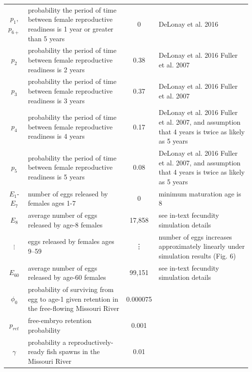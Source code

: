 \documentclass[12pt]{article}
\begin{document}
\begin{longtable}{cp{5.5cm}cp{5cm}}
$p_1$, $p_{6+}$ & probability the period of time between female reproductive readiness is 1 year or greater than 5 years \newline & 0 & DeLonay et al. 2016\\
$p_2$ & probability the period of time between female reproductive readiness is 2 years \newline & 0.38 & DeLonay et al. 2016 \newline Fuller et al. 2007\\
$p_3$ & probability the period of time between female reproductive readiness is 3 years \newline & 0.37 & DeLonay et al. 2016 \newline Fuller et al. 2007\\
$p_4$ & probability the period of time between female reproductive readiness is 4 years \newline & 0.17 & DeLonay et al. 2016 \newline Fuller et al. 2007, and \newline assumption that 4 years is twice as likely as 5 years \newline\\
$p_5$ & probability the period of time between female reproductive readiness is 5 years \newline & 0.08 & DeLonay et al. 2016 \newline Fuller et al. 2007, and \newline assumption that 4 years is twice as likely as 5 years\newline\\
$E_{1}$-$E_7$ & number of eggs released by females ages 1-7 \newline & 0 & minimum maturation age is 8\\
$E_8$ & average number of eggs released by age-8 females \newline & 17,858 & see in-text fecundity simulation details\\
$\vdots$ & eggs released by females ages 9--59 \newline & \vdots & number of eggs increases approximately linearly under simulation results (Fig. 6) \newline \\
$E_{60}$ & average number of eggs released by age-60 females \newline & 99,151 & see in-text fecundity simulation details\\
$\phi_{0}$ & probability of surviving from egg to age-1 given retention in the free-flowing Missouri River \newline & 0.000075 & \\
$p_{ret}$ & free-embryo retention probability\newline & 0.001 & \\
$\gamma$ & probability a reproductively-ready fish spawns in the Missouri River \newline & 0.01 & \\
\hline
\end{longtable}
\end{document}

